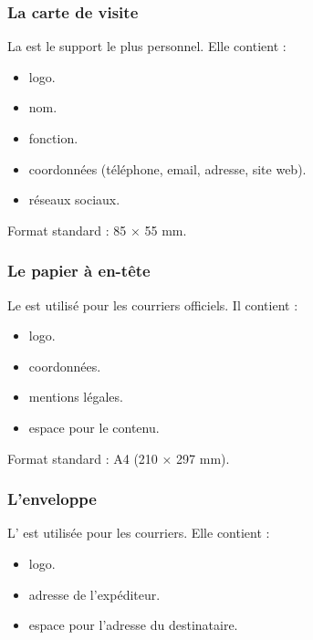 \subsubsection{La carte de visite}

La  est le support le plus personnel. Elle contient :

\begin{itemize}
    \item {} logo.
    \item {} nom.
    \item {} fonction.
    \item {} coordonnées (téléphone, email, adresse, site web).
    \item {} réseaux sociaux.
\end{itemize}

Format standard : 85 × 55 mm.

\subsubsection{Le papier à en-tête}

Le  est utilisé pour les courriers officiels. Il contient :

\begin{itemize}
    \item {} logo.
    \item {} coordonnées.
    \item {} mentions légales.
    \item {} espace pour le contenu.
\end{itemize}

Format standard : A4 (210 × 297 mm).

\subsubsection{L'enveloppe}

L' est utilisée pour les courriers. Elle contient :

\begin{itemize}
    \item {} logo.
    \item {}adresse de l'expéditeur.
    \item {} espace pour l'adresse du destinataire.
\end{itemize}

